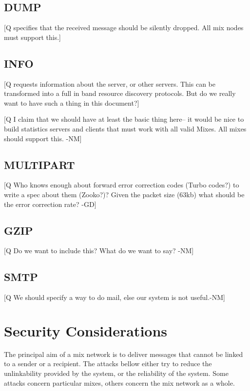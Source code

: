 \documentclass{article}
\begin{document}
\subsection{DUMP}

[Q specifies that the received message should be silently dropped.
All mix nodes must support this.]

\subsection{INFO}

[Q requests information about the server, or other servers. This can be
transformed into a full in band resource discovery protocols. But do
we really want to have such a thing in this document?]

[Q I claim that we should have at least the basic thing here-- it
would be nice to build statistics servers and clients that must work
with all valid Mixes.  All mixes should support this. -NM]

\subsection{MULTIPART}

[Q Who knows enough about forward error correction codes (Turbo codes?)
to write a spec about them (Zooko?)? Given the packet size (63kb)
what should be the error correction rate? -GD]

\subsection{GZIP}

[Q Do we want to include this?  What do we want to say? -NM]

\subsection{SMTP}

[Q We should specify a way to do mail, else our system is not useful.-NM]

\section{Security Considerations}

The principal aim of a mix network is
to deliver messages that cannot be linked to a sender or a
recipient. The attacks bellow either try to reduce the unlinkability
provided by the system, or the reliability of the system. Some
attacks concern particular mixes, others concern the mix network as a
whole.
\end{document}
